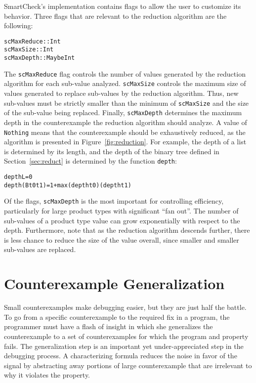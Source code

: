 \documentclass{sigplanconf}
\newenvironment{code}{\begin{alltt}}{\end{alltt}}
\newcommand{\ttp}[1]{\texttt{#1}}
\begin{document}
SmartCheck's implementation contains flags to allow the user to customize its
behavior.  Three flags that are relevant to the reduction algorithm are the
following:
%
\begin{code}
scMaxReduce :: Int
scMaxSize   :: Int
scMaxDepth  :: Maybe Int
\end{code}
%
\noindent
The \ttp{scMaxReduce} flag controls the number of values generated by the
reduction algorithm for each sub-value analyzed.  \ttp{scMaxSize} controls the
maximum size of values generated to replace sub-values by the reduction
algorithm.  Thus, new sub-values must be strictly smaller than the minimum of
\ttp{scMaxSize} and the size of the sub-value being replaced.  Finally,
\ttp{scMaxDepth} determines the maximum depth in the counterexample the
reduction algorithm should analyze.  A value of \ttp{Nothing} means that the
counterexample should be exhaustively reduced, as the algorithm is presented in
Figure~\ref{fig:reduction}.  For example, the depth of a list is determined by
its length, and the depth of the binary tree defined in Section~\ref{sec:reduct}
is determined by the function \ttp{depth}:
%
\begin{code}
depth L         = 0
depth (B t0 t1) = 1 + max (depth t0) (depth t1)
\end{code}
%
\noindent
Of the flags, \ttp{scMaxDepth} is the most important for controlling
efficiency, particularly for large product types with significant ``fan out''.
The number of sub-values of a product type value can grow exponentially with
respect to the depth.  Furthermore, note that as the reduction algorithm
descends further, there is less chance to reduce the size of the value overall,
since smaller and smaller sub-values are replaced.


\section{Counterexample Generalization}\label{sec:generalization}

Small counterexamples make debugging easier, but they are just half the battle.
To go from a specific counterexample to the required fix in a program, the
programmer must have a flash of insight in which she generalizes the
counterexample to a set of counterexamples for which the program and property
fails.  The generalization step is an important yet under-appreciated step in
the debugging process.  A characterizing formula reduces the noise in favor of
the signal by abstracting away portions of large counterexample that are
irrelevant to why it violates the property.
\end{document}
